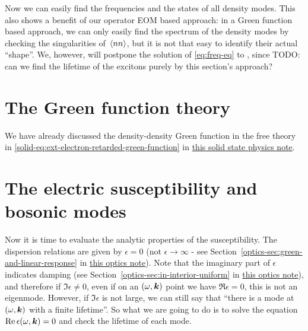 \documentclass[hyperref, a4paper]{article}
\newcommand{\soliddoc}{\href{../solid/solid.pdf}{this solid state physics note}}
\newcommand{\opticsdoc}{\href{../optics/optics.pdf}{this optics note}}
\begin{document}
Now we can easily find the frequencies and the states of all density modes. This also shows a benefit 
of our operator EOM based approach: in a Green function based approach, we can only easily find the 
spectrum of the density modes by checking the singularities of $\expval*{nn}$, but it is not that 
easy to identify their actual ``shape''. We, however, will postpone the solution of \eqref{eq:freq-eq} \marginnote{}
to , since TODO: can we find the lifetime of the excitons purely by this section's approach?

\section{The Green function theory}\label{sec:green}

We have already discussed the density-density Green function in the free theory in \eqref{solid-eq:ext-electron-retarded-green-function} in \soliddoc. 


\section{The electric susceptibility and bosonic modes}\label{sec:boson-modes}

Now it is time to evaluate the analytic properties of the susceptibility. 
The dispersion relations are given by $\epsilon = 0$ (not $\epsilon \to \infty$ - see 
Section~\ref{optics-sec:green-and-linear-response} in \opticsdoc). 
Note that the imaginary part of $\epsilon$ indicates damping (see Section~\ref{optics-sec:in-interior-uniform}
in \opticsdoc), and therefore if $\Im \epsilon \neq 0$, even if on an $(\omega, \vb*{k})$ point we have 
$\Re \epsilon = 0$, this is not an eigenmode. However, if $\Im \epsilon$ is not large, we can still say 
that ``there is a mode at $(\omega, \vb*{k})$ with a finite lifetime''. So what we are going to do is 
to solve the equation $\Re \epsilon(\omega, \vb*{k}) = 0$ and check the lifetime of each mode.
\end{document}

